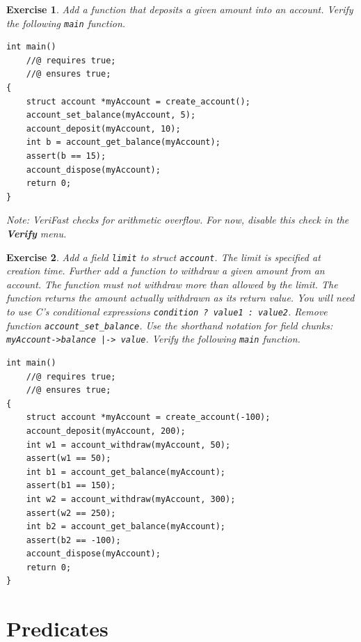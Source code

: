 \documentclass{article}
\newtheorem{exercise}{Exercise}
\begin{document}
\begin{exercise}\label{exercise:deposit}
Add a function that deposits a given amount into an account.
Verify the following \lstinline!main! function.
\begin{lstlisting}
int main()
    //@ requires true;
    //@ ensures true;
{
    struct account *myAccount = create_account();
    account_set_balance(myAccount, 5);
    account_deposit(myAccount, 10);
    int b = account_get_balance(myAccount);
    assert(b == 15);
    account_dispose(myAccount);
    return 0;
}
\end{lstlisting}
Note: VeriFast checks for arithmetic overflow. For now, disable
this check in the \textbf{Verify} menu.
\end{exercise}

\begin{exercise}\label{exercise:limit}
Add a field \lstinline!limit! to struct \lstinline!account!.
The limit is specified at creation time. Further add a function
to withdraw a given amount from an account. The function must
not withdraw more than allowed by the limit. The function
returns the amount actually withdrawn as its return value. You
will need to use C's conditional expressions
\lstinline!condition ? value1 : value2!. Remove function
\lstinline!account_set_balance!. Use the shorthand notation for
field chunks: \lstinline!myAccount->balance |-> value!. Verify
the following \lstinline!main! function.
\begin{lstlisting}
int main()
    //@ requires true;
    //@ ensures true;
{
    struct account *myAccount = create_account(-100);
    account_deposit(myAccount, 200);
    int w1 = account_withdraw(myAccount, 50);
    assert(w1 == 50);
    int b1 = account_get_balance(myAccount);
    assert(b1 == 150);
    int w2 = account_withdraw(myAccount, 300);
    assert(w2 == 250);
    int b2 = account_get_balance(myAccount);
    assert(b2 == -100);
    account_dispose(myAccount);
    return 0;
}
\end{lstlisting}
\end{exercise}

\section{Predicates}
\end{document}
